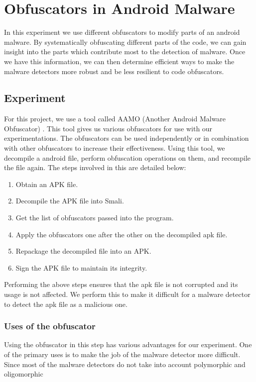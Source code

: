 \chapter{Obfuscators in Android Malware}

In this experiment we use different obfuscators to modify parts of an android malware. By systematically obfuscating different parts of the code, we can gain insight into the parts which contribute most to the detection of malware. Once we have this information, we can then determine efficient ways to make the malware detectors more robust and be less resilient to code obfuscators.

\section{Experiment}
For this project, we use a tool called AAMO (Another Android Malware Obfuscator) \cite{aamo}. This tool gives us various obfuscators for use with our experimentations. The obfuscators can be used independently or in combination with other obfuscators to increase their effectiveness. Using this tool, we decompile a android file, perform obfuscation operations on them, and recompile the file again.
 The steps involved in this are detailed below:
 
 \begin{enumerate}
	 \item Obtain an APK file.
	 \item Decompile the APK file into Smali.
	 \item Get the list of obfuscators passed into the program.
	 \item Apply the obfuscators one after the other on the decompiled apk file.
	 \item Repackage the decompiled file into an APK.
	 \item Sign the APK file to maintain its integrity.
 \end{enumerate}
 
 Performing the above steps ensures that the apk file is not corrupted and its usage is not affected. We perform this to make it difficult for a malware detector to detect the apk file as a malicious one.
 
\subsection{Uses of the obfuscator}

Using the obfuscator in this step has various advantages for our experiment. One of the primary uses is to make the job of the malware detector more difficult. Since most of the malware detectors do not take into account polymorphic and oligomorphic 